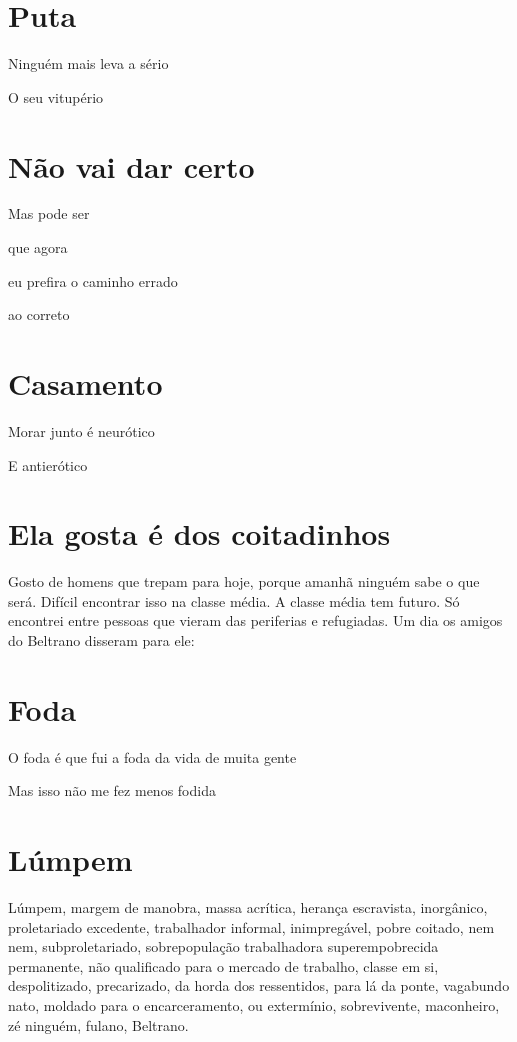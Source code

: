\chapter{Puta}

Ninguém mais leva a sério

O seu vitupério

\chapter{Não vai dar certo}

Mas pode ser

que agora

eu prefira o caminho errado

ao correto

\chapter{Casamento}

Morar junto é neurótico

E antierótico

\chapter{Ela gosta é dos coitadinhos}

Gosto de homens que trepam para hoje, porque amanhã ninguém sabe o que
será. Difícil encontrar isso na classe média. A classe média tem futuro.
Só encontrei entre pessoas que vieram das periferias e refugiadas. Um
dia os amigos do Beltrano disseram para ele:

\chapter{Foda}

O foda é que fui a foda da vida de muita gente

Mas isso não me fez menos fodida

\chapter{Lúmpem}

Lúmpem, margem de manobra, massa acrítica, herança escravista,
inorgânico, proletariado excedente, trabalhador informal, inimpregável,
pobre coitado, nem nem, subproletariado, sobrepopulação trabalhadora
superempobrecida permanente, não qualificado para o mercado de trabalho,
classe em si, despolitizado, precarizado, da horda dos ressentidos, para
lá da ponte, vagabundo nato, moldado para o encarceramento, ou
extermínio, sobrevivente, maconheiro, zé ninguém, fulano, Beltrano.

